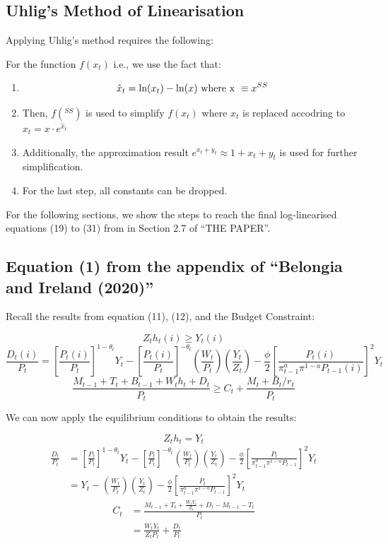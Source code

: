 \documentclass[11pt,preprint, authoryear]{elsarticle}
\numberwithin{equation}{section}
\numberwithin{figure}{section}
\numberwithin{table}{section}
\begin{document}
\hypertarget{uhligs-method-of-linearisation}{%
\subsection{Uhlig's Method of
Linearisation}\label{uhligs-method-of-linearisation}}

Applying Uhlig's method requires the following:

\newpage

For the function \(f(x_t)\) i.e., we use the fact that:

\begin{enumerate}
\def\labelenumi{\arabic{enumi}.}
\item
  \[\hat{x}_t = \ln(x_t) - \ln(x) \\
  \text{ where x } \equiv x^{SS}\]
\item
  Then, \(f(^{SS})\) is used to simplify \(f(x_t)\) where \(x_t\) is
  replaced accodring to \(x_t = x \cdot e^{\hat{x}_t}\)
\item
  Additionally, the approximation result
  \(e^{x_t+y_t} \approx 1+x_t+y_t\) is used for further simplification.
\item
  For the last step, all constants can be dropped.
\end{enumerate}

For the following sections, we show the steps to reach the final
log-linearised equations (19) to (31) from in Section 2.7 of ``THE
PAPER''.

\hypertarget{equation-1-from-the-appendix-of-belongia-and-ireland-2020}{%
\subsection{Equation (1) from the appendix of ``Belongia and Ireland
(2020)''}\label{equation-1-from-the-appendix-of-belongia-and-ireland-2020}}

Recall the results from equation (11), (12), and the Budget Constraint:

\[Z_th_t(i) \ge Y_t(i) \tag{11}\]
\[\frac{D_t(i)}{P_t}=[\frac{P_t(i)}{P_t}]^{1-\theta_t}Y_t-[\frac{P_t(i)}{P_t}]^{-\theta_t}(\frac{W_t}{P_t})(\frac{Y_t}{Z_t})-\frac{\phi}{2}[\frac{P_t(i)}{\pi_{t-1}^a \pi^{1-a}P_{t-1}(i)}]^2Y_t\tag{12}\]
\[\frac{M_{t-1}+T_{t}+B_{t-1}+W_{t} h_{t}+D_{t}}{P_{t}} \geq C_{t}+\frac{M_{t}+B_{t} / r_{t}}{P_{t}}\]

We can now apply the equilibrium conditions to obtain the results:

\[Z_th_t = Y_t \]
\[\begin{aligned} \frac{D_t}{P_t} & =[\frac{P_t}{P_t}]^{1-\theta_t}Y_t - [\frac{P_t}{P_t}]^{-\theta_t}(\frac{W_t}{P_t})(\frac{Y_t}{Z_t})-\frac{\phi}{2}[\frac{P_t}{\pi_{t-1}^a \pi^{1-a}P_{t-1}}]^2Y_t \\
& = Y_t - (\frac{W_t}{P_t})(\frac{Y_t}{Z_t}) - \frac{\phi}{2}[\frac{P_t}{\pi_{t-1}^a \pi^{1-a}P_{t-1}}]^2Y_t \end{aligned}\]
\[\begin{aligned} C_{t} &= \frac{M_{t-1}+T_{t}+\frac{W_tY_t}{Z_t}+D_{t} - M_{t-1} - T_t}{P_{t}}\\
& = \frac{W_tY_t}{Z_t P_t} + \frac{D_{t}}{P_t}
\end{aligned}\]
\end{document}
